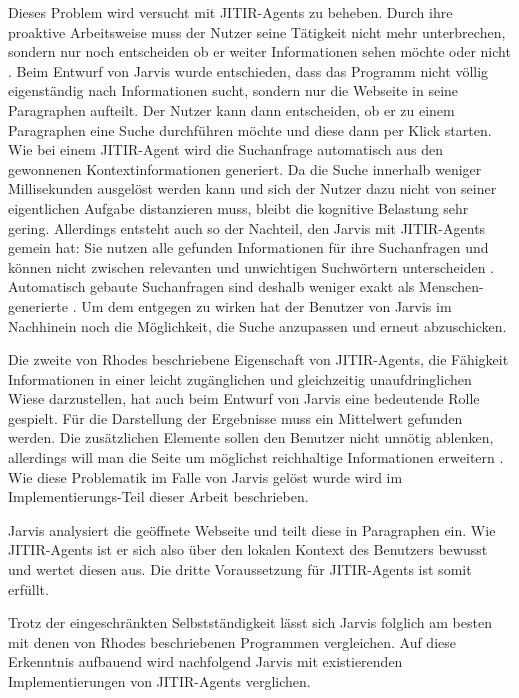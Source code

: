 Dieses Problem wird versucht mit JITIR-Agents zu beheben. Durch ihre proaktive Arbeitsweise muss der Nutzer seine Tätigkeit nicht mehr unterbrechen, sondern nur noch entscheiden ob er weiter Informationen sehen möchte oder nicht \cite{rhodes2000just}. Beim Entwurf von Jarvis wurde entschieden, dass das Programm nicht völlig eigenständig nach Informationen sucht, sondern nur die Webseite in seine Paragraphen aufteilt. Der Nutzer kann dann entscheiden, ob er zu einem Paragraphen eine Suche durchführen möchte und diese dann per Klick starten. Wie bei einem JITIR-Agent wird die Suchanfrage automatisch aus den gewonnenen Kontextinformationen generiert. Da die Suche innerhalb weniger Millisekunden ausgelöst werden kann und sich der Nutzer dazu nicht von seiner eigentlichen Aufgabe distanzieren muss, bleibt die kognitive Belastung sehr gering. Allerdings entsteht auch so der Nachteil, den Jarvis mit JITIR-Agents gemein hat: Sie nutzen alle gefunden Informationen für ihre Suchanfragen und können nicht zwischen relevanten und unwichtigen Suchwörtern unterscheiden \cite{rhodes2000margin}. Automatisch gebaute Suchanfragen sind deshalb weniger exakt als Menschen-generierte \cite{rhodes2000just}. Um dem entgegen zu wirken hat der Benutzer von Jarvis im Nachhinein noch die Möglichkeit, die Suche anzupassen und erneut abzuschicken.

Die zweite von Rhodes beschriebene Eigenschaft von JITIR-Agents, die Fähigkeit Informationen in einer leicht zugänglichen und gleichzeitig unaufdringlichen Wiese darzustellen, hat auch beim Entwurf von Jarvis eine bedeutende Rolle gespielt. Für die Darstellung der Ergebnisse muss ein Mittelwert gefunden werden. Die zusätzlichen Elemente sollen den Benutzer nicht unnötig ablenken, allerdings will man die Seite um möglichst reichhaltige Informationen erweitern \cite{rhodes2000margin}. Wie diese Problematik im Falle von Jarvis gelöst wurde wird im Implementierungs-Teil dieser Arbeit beschrieben.

Jarvis analysiert die geöffnete Webseite und teilt diese in Paragraphen ein. Wie JITIR-Agents ist er sich also über den lokalen Kontext des Benutzers bewusst und wertet diesen aus. Die dritte Voraussetzung für JITIR-Agents ist somit erfüllt.

Trotz der eingeschränkten Selbstständigkeit lässt sich Jarvis folglich am besten mit denen von Rhodes beschriebenen Programmen vergleichen. Auf diese Erkenntnis aufbauend wird nachfolgend Jarvis mit existierenden Implementierungen von JITIR-Agents verglichen.

